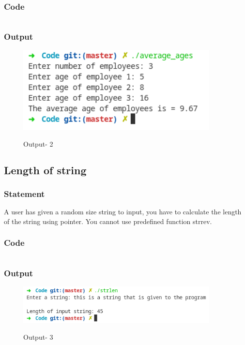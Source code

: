 \subsubsection{Code}
\inputminted[]{c}{../Code/average_ages.cpp}
\pagebreak
\subsubsection{Output}
\begin{figure}[!htb]
  \centering
  \includegraphics[width=4in]{Images/average.png}
  \label{Output-2}
  \caption{Output- 2}
\end{figure}


\pagebreak
\subsection{Length of string}

\subsubsection{Statement}
A user has given a random size string to input, you have to calculate the length of the
string using pointer. You cannot use predefined function strrev.

\subsubsection{Code}
\inputminted[]{c}{../Code/strlen.cpp}
\subsubsection{Output}
\begin{figure}[!htb]
  \centering
  \includegraphics[width=4in]{Images/strlen.png}
  \label{Output-3}
  \caption{Output- 3}
\end{figure}

